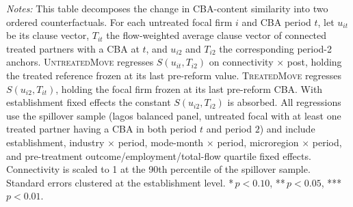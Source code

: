 \begin{table}[H]
\begin{minipage}{\linewidth}
\scriptsize\textit{Notes:} This table decomposes the change in CBA-content similarity into two ordered counterfactuals. For each untreated focal firm $i$ and CBA period $t$, let $u_{it}$ be its clause vector, $T_{it}$ the flow-weighted average clause vector of connected treated partners with a CBA at $t$, and $u_{i2}$ and $T_{i2}$ the corresponding period-2 anchors. \textsc{UntreatedMove} regresses $S(u_{it}, T_{i2})$ on connectivity $\times$ post, holding the treated reference frozen at its last pre-reform value. \textsc{TreatedMove} regresses $S(u_{i2}, T_{it})$, holding the focal firm frozen at its last pre-reform CBA. With establishment fixed effects the constant $S(u_{i2}, T_{i2})$ is absorbed. All regressions use the spillover sample (lagos balanced panel, untreated focal with at least one treated partner having a CBA in both period $t$ and period $2$) and include establishment, industry $\times$ period, mode-month $\times$ period, microregion $\times$ period, and pre-treatment outcome/employment/total-flow quartile fixed effects. Connectivity is scaled to 1 at the 90th percentile of the spillover sample. Standard errors clustered at the establishment level. *\,$p<0.10$, **\,$p<0.05$, ***\,$p<0.01$.
\end{minipage}
\end{table}
